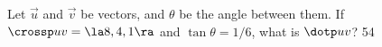 {Let $\vec u$ and $\vec v$ be vectors, and $\theta$ be the angle between them.  If $\crossp uv=\la 8,4,1 \ra$ and $\tan \theta=1/6$, what is $\dotp uv$?}
{54
}